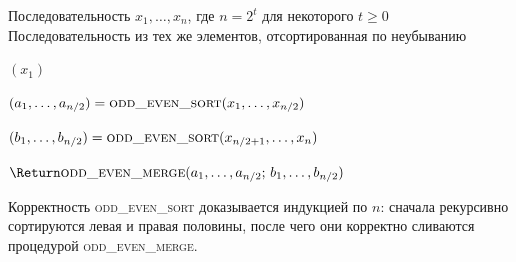 \begin{algorithm}[H]
	\caption{\textsc{odd\_even\_sort}$(x_1,\dots,x_n)$}
	\begin{algorithmic}[1]
		\Require Последовательность $x_1,\dots,x_n$, где $n=2^t$ для некоторого $t \ge 0$
		\Ensure Последовательность из тех же элементов, отсортированная по неубыванию
		
		\State \Return $(x_1)$
		\EndIf
		
		\State $(a_1,\dots,a_{n/2}) = \textsc{odd\_even\_sort}(x_1,\dots,x_{n/2})$
		
		\State $(b_1,\dots,b_{n/2}) = \textsc{odd\_even\_sort}(x_{n/2+1},\dots,x_n)$
		
		\State $\Return \textsc{odd\_even\_merge}(a_1,\dots,a_{n/2};\, b_1,\dots,b_{n/2})$
	\end{algorithmic}
\end{algorithm}

\begin{Remark}{}{}
	Корректность \textsc{odd\_even\_sort} доказывается индукцией по $n$:
	сначала рекурсивно сортируются левая и правая половины, после чего они корректно сливаются процедурой \textsc{odd\_even\_merge}.
\end{Remark}
